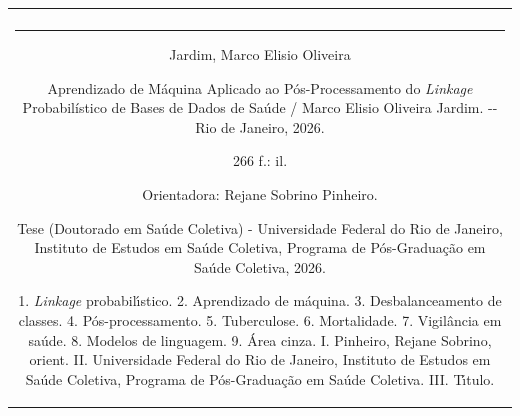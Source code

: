 \documentclass[12pt,a4paper,openany]{book}
\begin{document}
\begin{center}
\begin{tabular}{|c|}
\hline\\
\begin{minipage}{15cm}
\rule{15cm}{0pt} \flushright


\begin{minipage}{12.5cm}

Jardim, Marco Elisio Oliveira

\hspace{1,59cm} Aprendizado de M\'aquina Aplicado ao P\'os-Processamento do \textit{Linkage} Probabil\'istico de Bases de Dados de Sa\'ude / Marco Elisio Oliveira Jardim. -{}- Rio de Janeiro, 2026.

\hspace{1cm} 266 f.: il.

\hspace{1cm} Orientadora: Rejane Sobrino Pinheiro.

\hspace{1cm} Tese (Doutorado em Sa\'ude Coletiva) - Universidade Federal do Rio de Janeiro, Instituto de Estudos em Sa\'ude Coletiva, Programa de P\'os-Gradua\c{c}\~ao em Sa\'ude Coletiva, 2026.

\hspace{1cm} 1. \textit{Linkage} probabil\'{\i}stico. 2. Aprendizado de m\'aquina. 3. Desbalanceamento de classes. 4. P\'os-processamento. 5. Tuberculose. 6. Mortalidade. 7. Vigil\^ancia em sa\'ude. 8. Modelos de linguagem. 9. \'Area cinza. I. Pinheiro, Rejane Sobrino, orient. II. Universidade Federal do Rio de Janeiro, Instituto de Estudos em Sa\'ude Coletiva, Programa de P\'os-Gradua\c{c}\~ao em Sa\'ude Coletiva. III. T\'{\i}tulo.

\bigskip
\end{minipage}
\end{minipage}
\\
\hline
\end{tabular}
\end{center}




\end{document}
